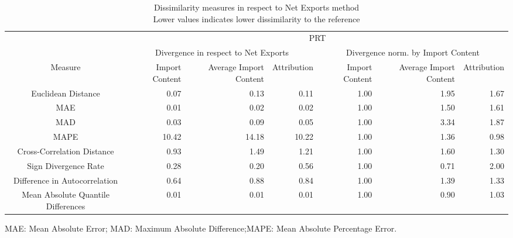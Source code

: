 \begin{table}[t]
\caption*{
{\large Dissimilarity measures in respect to Net Exports method} \\ 
{\small Lower values indicates lower dissimilarity to the reference}
} 
\fontsize{15.0pt}{18.0pt}\selectfont
\begin{tabular*}{\linewidth}{@{\extracolsep{\fill}}crrrrrr}
\toprule
 & \multicolumn{6}{c}{PRT} \\ 
\cmidrule(lr){2-7}
 & \multicolumn{3}{c}{Divergence in respect to Net Exports} & \multicolumn{3}{c}{Divergence norm. by Import Content} \\ 
\cmidrule(lr){2-4} \cmidrule(lr){5-7}
Measure & Import Content & Average Import Content & Attribution & Import Content & Average Import Content & Attribution \\ 
\midrule\addlinespace[2.5pt]
Euclidean Distance & 0.07 & 0.13 & 0.11 & 1.00 & 1.95 & 1.67 \\ 
MAE & 0.01 & 0.02 & 0.02 & 1.00 & 1.50 & 1.61 \\ 
MAD & 0.03 & 0.09 & 0.05 & 1.00 & 3.34 & 1.87 \\ 
MAPE & 10.42 & 14.18 & 10.22 & 1.00 & 1.36 & 0.98 \\ 
Cross-Correlation Distance & 0.93 & 1.49 & 1.21 & 1.00 & 1.60 & 1.30 \\ 
Sign Divergence Rate & 0.28 & 0.20 & 0.56 & 1.00 & 0.71 & 2.00 \\ 
Difference in Autocorrelation & 0.64 & 0.88 & 0.84 & 1.00 & 1.39 & 1.33 \\ 
Mean Absolute Quantile Differences & 0.01 & 0.01 & 0.01 & 1.00 & 0.90 & 1.03 \\ 
\bottomrule
\end{tabular*}
\begin{minipage}{\linewidth}
MAE: Mean Absolute Error; MAD: Maximum Absolute Difference;MAPE: Mean Absolute Percentage Error.\\
\end{minipage}
\end{table}

